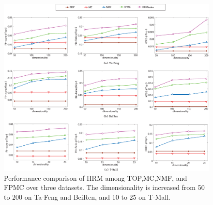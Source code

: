\documentclass[10pt,journal,compsoc]{IEEEtran}
\begin{document}
\begin{figure}[t]
\centering
\hspace*{1cm}\includegraphics[scale=0.27,viewport=5 0 1800 1500,clip=true]{performance.eps}
\caption{\label{fig:performance}Performance comparison of HRM among TOP,MC,NMF, and FPMC over three datasets. The dimensionality is increased from 50 to 200 on Ta-Feng and BeiRen, and 10 to 25 on T-Mall.}
\end{figure}
\end{document}
